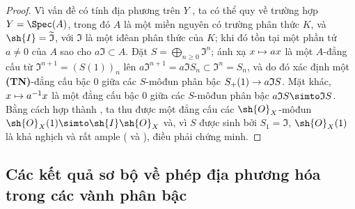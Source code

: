 \documentclass[oneside,10pt]{amsart}
\makeatletter
\renewcommand{\geq}{\geqslant}
\newcommand{\ega@arrow}[2]{\mathchoice{#1}{#2}{#2}{#2}}
\let\ega@shortmapsto\mapsto
\renewcommand{\to}{\ega@arrow{\longrightarrow}{\rightarrow}}
\renewcommand{\mapsto}{\ega@arrow{\longmapsto}{\ega@shortmapsto}}
\newcommand{\oldpage}[2][]{\marginnote{\normalfont\footnotesize\textbf{#1}~|~#2}\ignorespaces}
\let\EGAOriginalLabel\label
\renewcommand{\label}[1]{\phantomsection\EGAOriginalLabel{#1}}
\makeatother
\begin{document}
\begin{proof}
Vì vấn đề có tính địa phương trên $Y$ , ta có thể quy về trường hợp $Y=\Spec(A)$, trong đó $A$ là một miền nguyên có trường phân thức $K$, và $\sh{I}=\widetilde{\mathfrak{I}}$, với $\mathfrak{I}$ là một iđêan phân thức của $K$;
khi đó tồn tại một phần tử $a\neq0$ của $A$ sao cho $a\mathfrak{I}\subset A$.
Đặt $S=\bigoplus_{n\geq0}\mathfrak{I}^n$;
ánh xạ $x\mapsto ax$ là một $A$-đẳng cấu từ $\mathfrak{I}^{n+1}=(S(1))_n$ lên $a\mathfrak{I}^{n+1}=a\mathfrak{I}S_n\subset\mathfrak{I}^n=S_n$,
\oldpage[II]{157}
và do đó xác định một \textbf{(TN)}-đẳng cấu bậc $0$ giữa các $S$-môđun phân bậc $S_+(1)\to a\mathfrak{I}S$.
Mặt khác, $x\mapsto a^{-1}x$ là một đẳng cấu bậc $0$ giữa các $S$-môđun phân bậc $a\mathfrak{I}S\simto\mathfrak{I}S$.
Bằng cách hợp thành , ta thu được một đẳng cấu các $\sh{O}_X$-môđun $\sh{O}_X(1)\simto\sh{I}\sh{O}_X$ và, vì $S$ được sinh bởi $S_1=\mathfrak{I}$, $\sh{O}_X(1)$ là khả nghịch  và rất ample ( và ), điều phải chứng minh.
\end{proof}

\subsection{Các kết quả sơ bộ về phép địa phương hóa trong các vành phân bậc}
\label{subsection:II.8.2}
\end{document}

